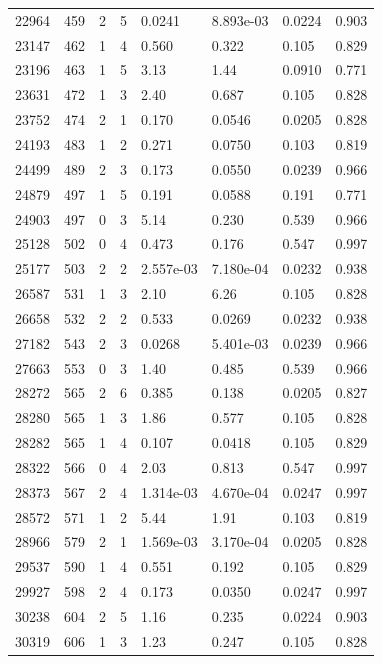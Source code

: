 \documentclass[preview]{standalone}
\begin{document}
{{{{\begin{tabular}{L{1.2cm}C{1.2cm} C{0.3cm}C{0.5cm} C{1.4cm}C{1.4cm} C{1.4cm}C{1.4cm}}
  22964  &   459  & 2     &  5 &  0.0241  & 8.893e-03  & 0.0224 &  0.903   \\ 
  23147  &   462  & 1     &  4 &  0.560  & 0.322  & 0.105 &  0.829   \\ 
  23196  &   463  & 1     &  5 &  3.13  & 1.44  & 0.0910 &  0.771   \\ 
  23631  &   472  & 1     &  3 &  2.40  & 0.687  & 0.105 &  0.828   \\ 
  23752  &   474  & 2     &  1 &  0.170  & 0.0546  & 0.0205 &  0.828   \\ 
  24193  &   483  & 1     &  2 &  0.271  & 0.0750  & 0.103 &  0.819   \\ 
  24499  &   489  & 2     &  3 &  0.173  & 0.0550  & 0.0239 &  0.966   \\ 
  24879  &   497  & 1     &  5 &  0.191  & 0.0588  & 0.191 &  0.771   \\ 
  24903  &   497  & 0     &  3 &  5.14  & 0.230  & 0.539 &  0.966   \\ 
  25128  &   502  & 0     &  4 &  0.473  & 0.176  & 0.547 &  0.997   \\ 
  25177  &   503  & 2     &  2 &  2.557e-03  & 7.180e-04  & 0.0232 &  0.938   \\ 
  26587  &   531  & 1     &  3 &  2.10  & 6.26  & 0.105 &  0.828   \\ 
  26658  &   532  & 2     &  2 &  0.533  & 0.0269  & 0.0232 &  0.938   \\ 
  27182  &   543  & 2     &  3 &  0.0268  & 5.401e-03  & 0.0239 &  0.966   \\ 
  27663  &   553  & 0     &  3 &  1.40  & 0.485  & 0.539 &  0.966   \\ 
  28272  &   565  & 2     &  6 &  0.385  & 0.138  & 0.0205 &  0.827   \\ 
  28280  &   565  & 1     &  3 &  1.86  & 0.577  & 0.105 &  0.828   \\ 
  28282  &   565  & 1     &  4 &  0.107  & 0.0418  & 0.105 &  0.829   \\ 
  28322  &   566  & 0     &  4 &  2.03  & 0.813  & 0.547 &  0.997   \\ 
  28373  &   567  & 2     &  4 &  1.314e-03  & 4.670e-04  & 0.0247 &  0.997   \\ 
  28572  &   571  & 1     &  2 &  5.44  & 1.91  & 0.103 &  0.819   \\ 
  28966  &   579  & 2     &  1 &  1.569e-03  & 3.170e-04  & 0.0205 &  0.828   \\ 
  29537  &   590  & 1     &  4 &  0.551  & 0.192  & 0.105 &  0.829   \\ 
  29927  &   598  & 2     &  4 &  0.173  & 0.0350  & 0.0247 &  0.997   \\ 
  30238  &   604  & 2     &  5 &  1.16  & 0.235  & 0.0224 &  0.903   \\ 
  30319  &   606  & 1     &  3 &  1.23  & 0.247  & 0.105 &  0.828   \\ 
\hline 
\end{tabular} 

}}}}
\end{document}
